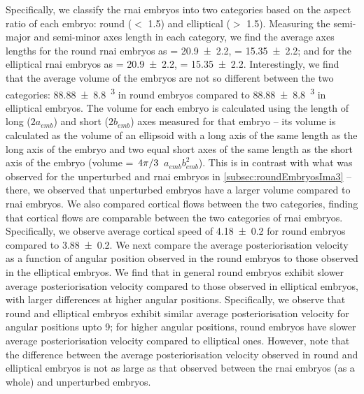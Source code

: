 Specifically, we classify the  \ac{rnai} embryos into two categories based on the aspect ratio of each embryo: round (\aspectRatio $<$ \num{1.5}) and elliptical (\aspectRatio $>$ \num{1.5}). Measuring the semi-major and semi-minor axes length in each category, we find the average axes lengths for the round  \ac{rnai} embryos as \longAxisLength = \SI{20.9 +- 2.2}{\unitLength}, \shortAxisLength = \SI{15.35 +- 2.2}{\unitLength}; and for the elliptical 
 \ac{rnai} embryos as \longAxisLength = \SI{20.9 +- 2.2}{\unitLength}, \shortAxisLength = \SI{15.35 +- 2.2}{\unitLength}. Interestingly, we find that the average volume of the embryos are not so different between the two categories: \SI{88.88 +- 8.8}{\unitLength\cubed} in round embryos compared to \SI{88.88 +- 8.8}{\unitLength\cubed} in elliptical embryos. The volume for each embryo is calculated using the length of long ($2a_{emb}$) and short ($2b_{emb}$) axes measured for that embryo -- its volume is calculated as the volume of an ellipsoid with a long axis of the same length as the long axis of the embryo and two equal short axes of the same length as the short axis of the embryo (volume = $\flatfrac{4\pi}{3}$ $a_{emb}b_{emb}^2$). This is in contrast with what was observed for the unperturbed and  \ac{rnai} embryos in \autoref{subsec:roundEmbryosIma3} -- there, we observed that unperturbed embryos have a larger volume compared to  \ac{rnai} embryos. We also compared cortical flows between the two categories, finding that cortical flows are comparable between the two categories of  \ac{rnai} embryos. Specifically, we observe average cortical speed of \SI{4.18 +- 0.2}{\unitCrtxVel} for round embryos compared to \SI{3.88 +- 0.2}{\unitCrtxVel}. We next compare the average posteriorisation velocity as a function of angular position observed in the round embryos to those observed in the elliptical embryos. We find that in general round embryos exhibit slower average posteriorisation velocity compared to those observed in elliptical embryos, with larger differences at higher angular positions. Specifically, we observe that round and elliptical embryos exhibit similar average posteriorisation velocity for angular positions upto \SI{9}{\unitAngle}; for higher angular positions, round embryos have slower average posteriorisation velocity compared to elliptical ones. However, note that the difference between the average posteriorisation velocity observed in round and elliptical embryos is not as large as that observed between the  \ac{rnai} embryos (as a whole) and unperturbed embryos.

